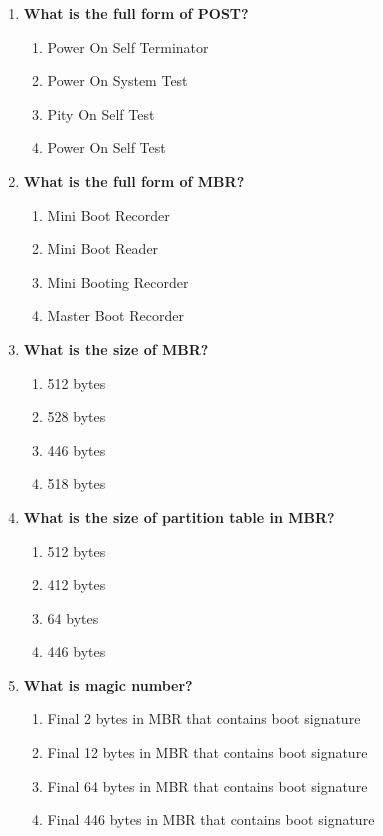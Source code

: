 \begin{flushleft}
\begin{enumerate}
		\item \textbf{What is the full form of POST?		}	
		\begin{enumerate}[label=(\alph*)]
			\item Power On Self Terminator
			\item Power On System Test    
			\item Pity On Self Test    
			\item Power On Self Test    %
		\end{enumerate}
		\bigskip
		\bigskip	
		\newpage
		\item \textbf{What is the full form of MBR?}
		\begin{enumerate}[label=(\alph*)]
			\item Mini Boot Recorder
			\item Mini Boot Reader
			\item Mini Booting Recorder   
			\item Master Boot Recorder    %
		\end{enumerate}
		\bigskip
		\bigskip	
		
		\item \textbf{What is the size of MBR?}
		\begin{enumerate}[label=(\alph*)]
			\item 512 bytes   %
			\item 528 bytes  
			\item 446 bytes 
			\item 518 bytes   
		\end{enumerate}
		\bigskip
		\bigskip	

		\item \textbf{What is the size of partition table in MBR?}
		\begin{enumerate}[label=(\alph*)]
			\item 512 bytes
			\item 412 bytes   
			\item 64 bytes     %
			\item 446 bytes   
		\end{enumerate}
		\bigskip
		\bigskip	

		\item \textbf{What is magic number?}
		\begin{enumerate}[label=(\alph*)]
			\item Final 2 bytes in MBR that contains boot signature    
			\item Final 12 bytes in MBR that contains boot signature    
			\item Final 64 bytes in MBR that contains boot signature    
			\item Final 446 bytes in MBR that contains boot signature    %
		\end{enumerate}
		\bigskip
		\bigskip	


\end{enumerate}
\end{flushleft}
